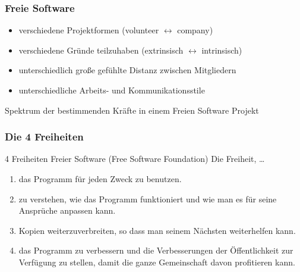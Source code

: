 \documentclass{beamer}
\begin{document}
\begin{frame}
\frametitle{Freie Software}
\begin{itemize}
 \item verschiedene Projektformen (volunteer $\leftrightarrow$ company)
 \item verschiedene Gr\"unde teilzuhaben (extrinsisch $\leftrightarrow$ intrinsisch)
 \item unterschiedlich gro\ss e gef\"uhlte Distanz zwischen Mitgliedern
 \item unterschiedliche Arbeits- und Kommunikationsstile
\end{itemize}

\begin{block}{Spektrum der bestimmenden Kr\"afte in einem Freien Software Projekt}
\begin{figure}[h]
	\centering
\end{figure}
\end{block}
\end{frame}

\begin{frame}
\frametitle{Die 4 Freiheiten}
\begin{block}{4 Freiheiten Freier Software (Free Software Foundation)}
    Die Freiheit, \dots
    \begin{enumerate}
      \item das Programm für jeden Zweck zu benutzen.
      \item zu verstehen, wie das Programm funktioniert und wie man es für seine Ansprüche anpassen kann.
      \item Kopien weiterzuverbreiten, so dass man seinem Nächsten weiterhelfen kann.
      \item das Programm zu verbessern und die Verbesserungen der Öffentlichkeit zur Verfügung zu stellen, damit die ganze Gemeinschaft davon profitieren kann.
    \end{enumerate}
\end{block}
\end{frame}
\end{document}
